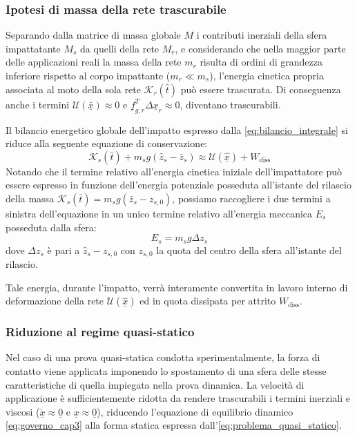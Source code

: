 \subsubsection{Ipotesi di massa della rete trascurabile}
Separando dalla matrice di massa globale $M$ i contributi inerziali della sfera impattatante $M_{s}$ da quelli della rete $M_{r}$, e considerando che nella maggior parte delle applicazioni reali la massa della rete $m_r$ risulta di ordini di grandezza inferiore rispetto al corpo impattante ($m_{r} \ll m_{s}$), l'energia cinetica propria associata al moto della sola rete $\mathcal{K}_{r}(\hat{t})$ può essere trascurata. Di conseguenza anche i termini $\mathcal{U}(\bar{\underline{x}}) \approx 0$ e $\underline{f}_{g,r}^T \Delta \underline{x}_{r} \approx 0$, diventano trascurabili.

Il bilancio energetico globale dell'impatto espresso dalla \eqref{eq:bilancio_integrale} si riduce alla seguente equazione di conservazione:
\begin{equation}
   \mathcal{K}_s(\bar{t}) + m_{s} g (\hat{z}_s - \bar{z}_s) \approx \mathcal{U}(\hat{\underline{x}}) + W_{\text{diss}}    
   \label{eq:bilancio_semplificato}
\end{equation}
Notando che il termine relativo all'energia cinetica iniziale dell'impattatore può essere espresso in funzione dell'energia potenziale posseduta all'istante del rilascio della massa $\mathcal{K}_s(\bar{t}) = m_s g (\bar{z}_s - {z}_{s,0})$, possiamo raccogliere i due termini a sinistra dell'equazione in un unico termine relativo all'energia meccanica $E_s$ posseduta dalla sfera:
\begin{equation}
  E_{s} = m_s g \Delta z_s
\end{equation}
dove $\Delta z_s$ è pari a $\hat{z}_s - z_{s,0}$ con $z_{s,0}$ la quota del centro della sfera all'istante del rilascio.
 
Tale energia, durante l'impatto, verrà interamente convertita in lavoro interno di deformazione della rete $\mathcal{U}(\hat{\underline{x}})$ ed in quota dissipata per attrito $W_{\text{diss}}$.

\subsubsection{Riduzione al regime quasi-statico}
Nel caso di una prova quasi-statica condotta sperimentalmente, la forza di contatto viene applicata imponendo lo spostamento di una sfera delle stesse caratteristiche di quella impiegata nella prova dinamica. La velocità di applicazione è sufficientemente ridotta da rendere trascurabili i termini inerziali e viscosi ($\ddot{\underline{x}} \approx \underline{0}$ e $\dot{\underline{x}} \approx \underline{0}$), riducendo l'equazione di equilibrio dinamico \eqref{eq:governo_cap3} alla forma statica espressa dall'\cref{eq:problema_quasi_statico}.

